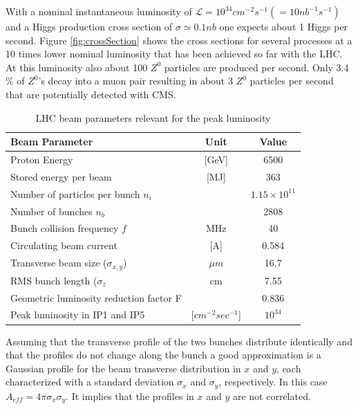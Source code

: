 With a nominal instantaneous luminosity of $\mathcal{L} = 10^{34} cm^{-2} s^{-1} (= 10 nb^{-1} s^{-1})$ and a Higgs production cross section of $\sigma \simeq 0.1 nb$ one expects about 1 Higgs per second. Figure \ref{fig:crossSection} shows the cross sections for several processes at a 10 times lower  nominal luminosity that has been achieved so far with the LHC. At this luminosity also about 100 $Z^{0}$ particles are produced per second. Only 3.4 \% of $Z^{0}$'s decay into a muon pair resulting in about 3 $Z^{0}$ particles per second that are potentially detected with CMS.


\begin{table}[htp]
\begin{center}
\begin{tabular}{|l|c|c|}
\hline
{\bf Beam Parameter} & {\bf Unit} & {\bf Value} \\ \hline
Proton Energy & [GeV] & 6500 \\ \hline
Stored energy per beam & [MJ] & 363 \\ \hline
Number of particles per bunch $n_{i}$ & & $1.15 \times 10^{11}$ \\ \hline
Number of bunches $n_{b}$ & & 2808 \\ \hline
Bunch collision frequency $f$ & MHz & 40 \\ \hline
Circulating beam current & [A] & 0.584 \\ \hline
Transverse beam size ($\sigma_{x,y}$) & $\mu m$ & 16.7 \\ \hline
RMS bunch length ($\sigma_{z}$ & cm & 7.55 \\ \hline
Geometric luminosity reduction factor F & & 0.836 \\ \hline
Peak luminosity in IP1 and IP5 & [$cm^{-2} sec^{-1}$] & $10^{34}$ \\ \hline \hline

\end{tabular}
\end{center}
    \captionsetup{format=hang}
     \caption{LHC beam parameters relevant for the peak luminosity \cite{fill-schemes}}
    \label{tbl:beamParam}
\end{table}%


Assuming that the transverse profile of the two bunches distribute identically and that the profiles do not change along the bunch a good approximation is a Gaussian profile for the beam transverse distribution in $x$ and $y$, each characterized with a standard deviation $\sigma_{x}$ and $\sigma_{y}$, respectively. In this case $A_{eff} = 4 \pi \sigma_{x} \sigma_{y}$. It implies that the profiles in $x$ and $y$ are not correlated.


